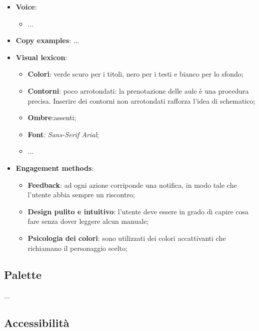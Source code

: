 \begin{itemize}
\begin{center}
\begin{tikzpicture}
            \end{tikzpicture}
        \end{center}

    
    \item \textbf{Voice}: 
		\begin{itemize}
            \item ...
		\end{itemize}
    
    \item \textbf{Copy examples}: ...
    
    \item \textbf{Visual lexicon}:
		\begin{itemize}
			\item \textbf{Colori}: verde scuro per i titoli, nero per i testi e bianco per lo sfondo;  
			\item \textbf{Contorni}: poco arrotondati: la prenotazione delle aule è una procedura precisa. Inserire dei contorni non 
            arrotondati rafforza l'idea di schematico; 
			\item \textbf{Ombre}:assenti;
			\item \textbf{Font}: \textit{Sans-Serif Arial};
            \item ...
		\end{itemize}
    
    \item \textbf{Engagement methods}:
		\begin{itemize}
			\item \textbf{Feedback}: ad ogni azione corriponde una notifica, in
				modo tale che l'utente abbia sempre un riscontro;

			\item \textbf{Design pulito e intuitivo}: l'utente deve essere in
				grado di capire cosa fare senza dover leggere alcun manuale;

			\item \textbf{Psicologia dei colori}: sono utilizzati dei colori
				accattivanti che richiamano il personaggio scelto;

		\end{itemize}
\end{itemize}

\subsection{Palette}

...

\subsection{Accessibilità}

